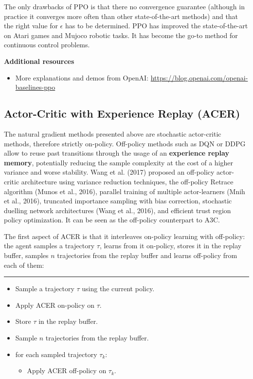 \documentclass[
  letterpaper,
  DIV=11,
  numbers=noendperiod]{scrreprt}
\providecommand{\tightlist}{%
  \setlength{\itemsep}{0pt}\setlength{\parskip}{0pt}}\usepackage{longtable,booktabs,array}
\begin{document}
The only drawbacks of PPO is that there no convergence guarantee
(although in practice it converges more often than other
state-of-the-art methods) and that the right value for \(\epsilon\) has
to be determined. PPO has improved the state-of-the-art on Atari games
and Mujoco robotic tasks. It has become the go-to method for continuous
control problems.

\textbf{Additional resources}

\begin{itemize}
\tightlist
\item
  More explanations and demos from OpenAI:
  \url{https://blog.openai.com/openai-baselines-ppo}
\end{itemize}

\hypertarget{actor-critic-with-experience-replay-acer}{%
\subsection{Actor-Critic with Experience Replay
(ACER)}\label{actor-critic-with-experience-replay-acer}}

The natural gradient methods presented above are stochastic actor-critic
methods, therefore strictly on-policy. Off-policy methods such as DQN or
DDPG allow to reuse past transitions through the usage of an
\textbf{experience replay memory}, potentially reducing the sample
complexity at the cost of a higher variance and worse stability. Wang et
al. (2017) proposed an off-policy actor-critic architecture using
variance reduction techniques, the off-policy Retrace algorithm (Munos
et al., 2016), parallel training of multiple actor-learners (Mnih et
al., 2016), truncated importance sampling with bias correction,
stochastic duelling network architectures (Wang et al., 2016), and
efficient trust region policy optimization. It can be seen as the
off-policy counterpart to A3C.

The first aspect of ACER is that it interleaves on-policy learning with
off-policy: the agent samples a trajectory \(\tau\), learns from it
on-policy, stores it in the replay buffer, samples \(n\) trajectories
from the replay buffer and learns off-policy from each of them:

\begin{center}\rule{0.5\linewidth}{0.5pt}\end{center}

\begin{itemize}
\item
  Sample a trajectory \(\tau\) using the current policy.
\item
  Apply ACER on-policy on \(\tau\).
\item
  Store \(\tau\) in the replay buffer.
\item
  Sample \(n\) trajectories from the replay buffer.
\item
  for each sampled trajectory \(\tau_k\):

  \begin{itemize}
  \tightlist
  \item
    Apply ACER off-policy on \(\tau_k\).
  \end{itemize}
\end{itemize}
\end{document}
